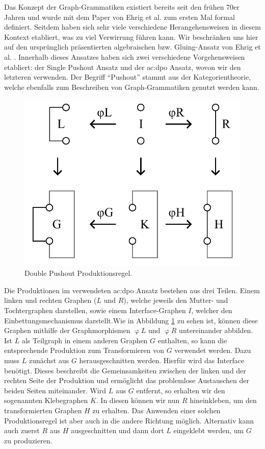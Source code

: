 Das Konzept der Graph-Grammatiken existiert bereits seit den frühen 70er Jahren und wurde mit dem Paper von Ehrig et al. \cite{7_ehrig_et_al}
zum ersten Mal formal definiert. Seitdem haben sich sehr viele verschiedene Herangehensweisen in diesem Kontext etabliert, was zu viel Verwirrung
führen kann. \cite{30_könig_et_al} Wir beschränken uns hier auf den ursprünglich präsentierten algebraischen bzw. Gluing-Ansatz von Ehrig 
et al. \cite{7_ehrig_et_al}. Innerhalb dieses Ansatzes haben sich zwei verschiedene Vorgehensweisen etabliert: der Single Pushout Ansatz und der
\gls{ac:dpo} Ansatz, wovon wir den letzteren verwenden. Der Begriff ``Pushout'' stammt aus der Kategorientheorie, welche ebenfalls zum Beschreiben
von Graph-Grammatiken genutzt werden kann. \cite{1_merrell}

\begin{figure}[t]
    \centering
    \includegraphics[width=\imgWidth/2]{images/dpo_rule.pdf}
    \caption{Double Pushout Produktionsregel.}
    \label{fig:dpo_rule}
\end{figure}

Die Produktionen im verwendeten \gls{ac:dpo} Ansatz bestehen aus drei Teilen. Einem linken und rechten Graphen (\(L\) und \(R\)), welche jeweils
den Mutter- und Tochtergraphen darstellen, sowie einem Interface-Graphen \(I\), welcher den Einbettungsmechanismus darstellt.Wie in Abbildung
\ref{fig:dpo_rule} zu sehen ist, können diese Graphen mithilfe der Graphmorphismen \(\upvarphi L\) und \(\upvarphi R\) untereinander abbilden.
Ist \(L\) als Teilgraph in einem anderen Graphen \(G\) enthalten, so kann die entsprechende Produktion zum Transformieren von \(G\) verwendet werden.
Dazu muss \(L\) zunächst aus \(G\) herausgeschnitten werden. Hierfür wird das Interface benötigt. Dieses beschreibt die Gemeinsamkeiten zwischen
der linken und der rechten Seite der Produktion und ermöglicht das problemlose Austauschen der beiden Seiten miteinander. Wird \(L\) aus \(G\)
entfernt, so erhalten wir den sogenannten Klebegraphen \(K\). In diesen können wir nun \(R\) hineinkleben, um den transformierten Graphen \(H\)
zu erhalten. Das Anwenden einer solchen Produktionsregel ist aber auch in die andere Richtung möglich. Alternativ kann auch zuerst \(R\) aus
\(H\) ausgeschnitten und dann dort \(L\) eingeklebt werden, um \(G\) zu produzieren. \cite{7_ehrig_et_al}

